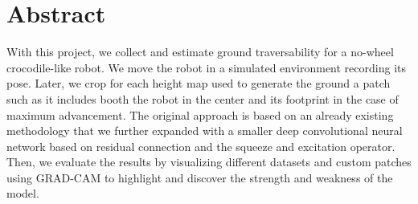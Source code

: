 \documentclass[../document.tex]{subfiles}
\begin{document}
\section{Abstract}
With this project, we collect and estimate ground traversability for a no-wheel crocodile-like robot. We move the robot in a simulated environment recording its pose. Later, we crop for each height map used to generate the ground a patch such as it includes booth the robot in the center and its footprint in the case of maximum advancement.
The original approach is based on 
an already existing methodology that we further expanded with a smaller deep convolutional neural network based on residual connection and the squeeze and excitation operator.
Then, we evaluate the results by visualizing different datasets and custom patches using GRAD-CAM to highlight and discover the strength and weakness of the model.
\end{document}

